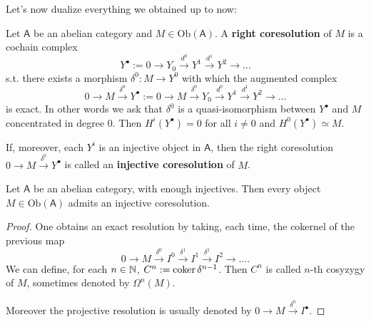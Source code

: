Let's now dualize everything we obtained up to now:
\begin{defn}
	Let $\mathsf{A}$ be an abelian category and $M \in \mathrm{Ob} \left(\mathsf{A}\right)$.
	A \textbf{right coresolution} of $M$ is a cochain complex
	\begin{equation}
	Y^\bullet := 0 \to Y_0 \xrightarrow{d^0} Y^1 \xrightarrow{d^1} Y^2 \to\ldots	
	\end{equation} 
	s.t. there exists a morphism $\delta^0: M \to Y^0$ with which the augmented complex
	\begin{equation}
	0 \to M \xrightarrow{\delta^0} Y^\bullet := 
	0 \to M \xrightarrow{\delta^0} Y_0 \xrightarrow{d^0} Y^1 \xrightarrow{d^1} Y^2 \to\ldots	
	\end{equation} 
	is exact.
	In other words we ask that $\delta^0$ is a quasi-isomorphism between
	$Y^\bullet$ and $M$ concentrated in degree $0$.
	Then $H^i(Y^\bullet) = 0$ for all $i \neq 0$ and $H^0(Y^\bullet) \simeq M$.

	If, moreover, each $Y^i$ is an injective object in $\mathsf{A}$,
	then the right coresolution $0 \to M \xrightarrow{\delta^0} Y^\bullet$ is called an
	\textbf{injective coresolution} of $M$.
\end{defn}

\begin{lem}
	Let $\mathsf{A}$ be an abelian category, with enough injectives.
	Then every object $M \in \mathrm{Ob} \left(\mathsf{A}\right)$ admits
	an injective coresolution.
\end{lem} 
\begin{proof}
	One obtains an exact resolution by taking, each time, the cokernel of the previous map
	\begin{equation}
		0 \to M \xrightarrow{\delta^0} I^0 \xrightarrow{\delta^1} I^1 \xrightarrow{\delta^1} I^2 \to \ldots
	.\end{equation} 
	We can define, for each $n \in \mathbb{N}$, $C^n := \operatorname{coker} \delta^{n-1}$.
	Then $C^n$ is called $n$-th cosyzygy of $M$, sometimes
	denoted by $\Omega^n(M)$.

	Moreover the projective resolution is usually
	denoted by $0 \to M \xrightarrow{\delta^0} I^{\bullet}$.
\end{proof}


